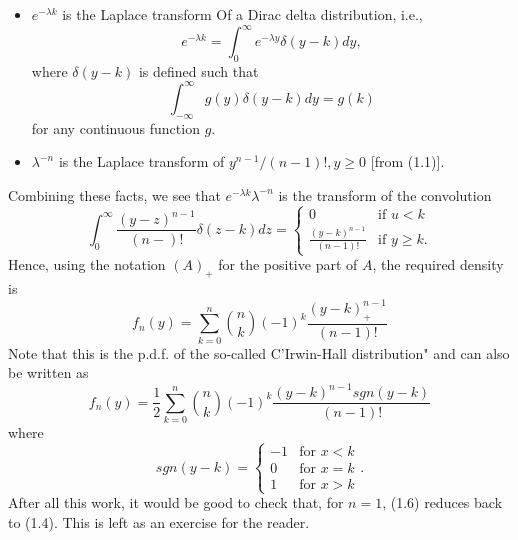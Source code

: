 \documentclass[11pt,a4paper]{article}
\begin{document}
\begin{enumerate}
\begin{enumerate}
      \begin{itemize}
        \item $e^{-\lambda k}$ is the Laplace transform Of a Dirac delta distribution, i.e.,
        $$
        e^{-\lambda k} = \int_0^\infty e^{-\lambda y}\delta(y - k)dy,
        $$
        where $\delta(y - k)$ is defined such that
        $$
        \int_{-\infty}^\infty g(y)\delta(y - k)dy = g(k)
        $$
        for any continuous function $g$.
        \item $\lambda^{-n}$ is the Laplace transform of $y^{n - 1}/(n - 1)!, y \geq 0$ [from (1.1)].
      \end{itemize}
      Combining these facts, we see that $e^{-\lambda k}\lambda^{-n}$ is the transform of the convolution
      $$
      \int_0^\infty \frac{(y - z)^{n - 1}}{(n - )!}\delta(z - k)dz =
      \begin{cases}
        0 & \text{if $u < k$}\\
        \frac{(y - k)^{n - 1}}{(n - 1)!} & \text{if $y\geq k$}.
      \end{cases}
      $$
      Hence, using the notation $(A)_+$ for the positive part of $A$, the required density is
      \begin{equation}\tag{1.6}
        f_n(y) = \sum_{k = 0}^n\binom{n}{k}(-1)^k\frac{(y - k)^{n - 1}_+}{(n - 1)!}
      \end{equation}
      Note that this is the p.d.f. of the so-called C'Irwin-Hall distribution" and can also be written as
      $$
      f_n(y) = \frac{1}{2}\sum_{k = 0}^n\binom{n}{k}(-1)^k\frac{(y - k)^{n - 1}sgn(y - k)}{(n - 1)!}
      $$
      where
      $$
      sgn(y - k) =
      \begin{cases}
        -1 & \text{for $x < k$}\\
        0 & \text{for $x = k$}\\
        1 & \text{for $x> k$}
      \end{cases}.
      $$
      After all this work, it would be good to check that, for $n = 1$, (1.6) reduces back to (1.4). This is left as an exercise for the reader.
    \end{enumerate}
  \end{enumerate}
\end{document}
